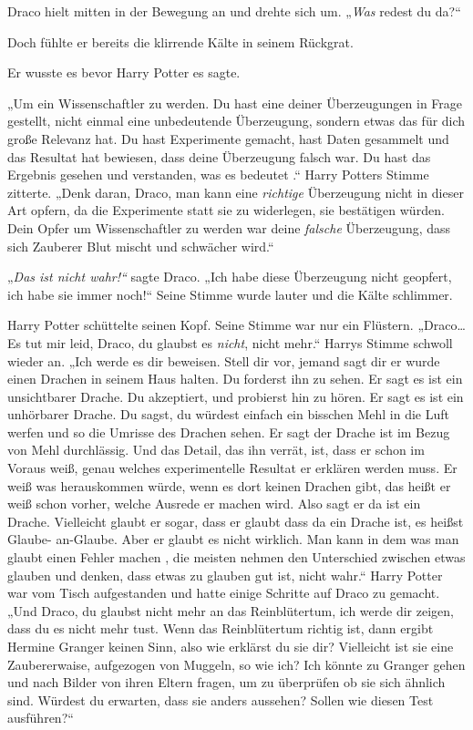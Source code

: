 {Draco hielt mitten in der Bewegung an und drehte sich um. „\emph{Was} redest du da?“

Doch fühlte er bereits die klirrende Kälte in seinem Rückgrat.

Er wusste es bevor Harry Potter es sagte.

„Um ein Wissenschaftler zu werden. Du hast eine deiner Überzeugungen in Frage gestellt, nicht einmal eine unbedeutende Überzeugung, sondern etwas das für dich große Relevanz hat. Du hast Experimente gemacht, hast Daten gesammelt und das Resultat hat bewiesen, dass deine Überzeugung falsch war. Du hast das Ergebnis gesehen und verstanden, was es bedeutet .“ Harry Potters Stimme zitterte. „Denk daran, Draco, man kann eine \emph{richtige} Überzeugung nicht in dieser Art opfern, da die Experimente statt sie zu widerlegen, sie bestätigen würden. Dein Opfer um Wissenschaftler zu werden war deine \emph{falsche} Überzeugung, dass sich Zauberer Blut mischt und schwächer wird.“

„\emph{Das ist nicht wahr!“} sagte Draco. „Ich habe diese Überzeugung nicht geopfert, ich habe sie immer noch!“ Seine Stimme wurde lauter und die Kälte schlimmer.

Harry Potter schüttelte seinen Kopf. Seine Stimme war nur ein Flüstern. „Draco… Es tut mir leid, Draco, du glaubst es \emph{nicht}, nicht mehr.“ Harrys Stimme schwoll wieder an. „Ich werde es dir beweisen. Stell dir vor, jemand sagt dir er wurde einen Drachen in seinem Haus halten. Du forderst ihn zu sehen. Er sagt es ist ein unsichtbarer Drache. Du akzeptiert, und probierst hin zu hören. Er sagt es ist ein unhörbarer Drache. Du sagst, du würdest einfach ein bisschen Mehl in die Luft werfen und so die Umrisse des Drachen sehen. Er sagt der Drache ist im Bezug von Mehl durchlässig. Und das Detail, das ihn verrät, ist, dass er schon im Voraus weiß, genau welches experimentelle Resultat er erklären werden muss. Er weiß was herauskommen würde, wenn es dort keinen Drachen gibt, das heißt er weiß schon vorher, welche Ausrede er machen wird. Also sagt er da ist ein Drache. Vielleicht glaubt er sogar, dass er glaubt dass da ein Drache ist, es heißst Glaube- an-Glaube. Aber er glaubt es nicht wirklich. Man kann in dem was man glaubt einen Fehler machen , die meisten nehmen den Unterschied zwischen etwas glauben und denken, dass etwas zu glauben gut ist, nicht wahr.“ Harry Potter war vom Tisch aufgestanden und hatte einige Schritte auf Draco zu gemacht. „Und Draco, du glaubst nicht mehr an das Reinblütertum, ich werde dir zeigen, dass du es nicht mehr tust. Wenn das Reinblütertum richtig ist, dann ergibt Hermine Granger keinen Sinn, also wie erklärst du sie dir? Vielleicht ist sie eine Zaubererwaise, aufgezogen von Muggeln, so wie ich? Ich könnte zu Granger gehen und nach Bilder von ihren Eltern fragen, um zu überprüfen ob sie sich ähnlich sind. Würdest du erwarten, dass sie anders aussehen? Sollen wie diesen Test ausführen?“

}
